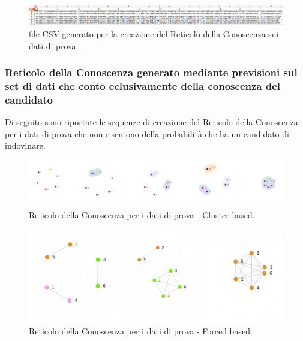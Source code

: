 \noindent
\begin{figure}[H]
\centering
	\includegraphics[width=1\linewidth]{./image/fileCSV_rete-prova.png}
	\caption{file CSV generato per la creazione del Reticolo della Conoscenza sui dati di prova.}
	\label{file CSV generato per la creazione del Reticolo della Conoscenza sui dati di prova.}
\end{figure}
\noindent

\subsubsection{Reticolo della Conoscenza generato mediante previsioni sul set di dati che conto eclusivamente della conoscenza del candidato}
\label{Reticolo della Conoscenza generato mediante previsioni sul set di dati che tiene conto eclusivamente della conoscenza del candidato}

Di seguito sono riportate le sequenze di creazione del Reticolo della Conoscenza per i dati di prova che non risentono della probabilit\`a che ha un candidato di indovinare.
\noindent

\begin{figure}[H]
\centering
	\includegraphics[width=1.20\linewidth]{./image/collage_reticolo-general-cluster.png}
	\caption{Reticolo della Conoscenza per i dati di prova - Cluster based.}
	\label{Reticolo della Conoscenza per i dati di prova - Cluster based.}
\end{figure}
\noindent

\begin{figure}[H]
\centering
	\includegraphics[width=1\linewidth]{./image/collage_reticolo-general-forced.png}
	\caption{Reticolo della Conoscenza per i dati di prova - Forced based.}
	\label{Reticolo della Conoscenza per i dati di prova - Forced based.}
\end{figure}
\noindent

